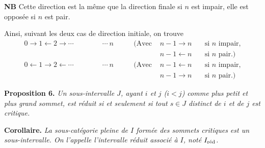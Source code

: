 \documentclass[11pt]{article}
\newcommand{\printedpage}[1]{\marginpar{\footnotesize p.~#1}}
\begin{document}
\textbf{NB} Cette direction est la même que la direction finale si $n$ est impair, elle est opposée si $n$ est pair.

Ainsi, suivant les deux cas de direction initiale, on trouve
\[
\begin{aligned}
0 \longrightarrow 1 \longleftarrow 2 \longrightarrow \cdots \qquad\qquad \cdots\ n & \qquad (\text{Avec } & n-1 \longrightarrow n & \quad \text{si } n \text{ impair,}\\
& & n-1 \longleftarrow n & \quad \text{si } n \text{ pair.)}\\
0 \longleftarrow 1 \longrightarrow 2 \longleftarrow \cdots \qquad\qquad \cdots\ n & \qquad (\text{Avec } & n-1 \longleftarrow n & \quad \text{si } n \text{ impair,}\\
& & n-1 \longrightarrow n & \quad \text{si } n \text{ pair.)}
\end{aligned}
\]

\printedpage{8}

\textbf{Proposition 6.} \textit{Un sous-intervalle $J$, ayant $i$ et $j$ ($i < j$) comme plus petit et plus grand sommet, est réduit si et seulement si tout $s \in J$ distinct de $i$ et de $j$ est critique.}

\textbf{Corollaire.} \textit{La sous-catégorie pleine de $I$ formée des sommets critiques est un sous-intervalle. On l'appelle l'intervalle réduit associé à $I$, noté $I_{\textup{réd}}$.}
\end{document}
